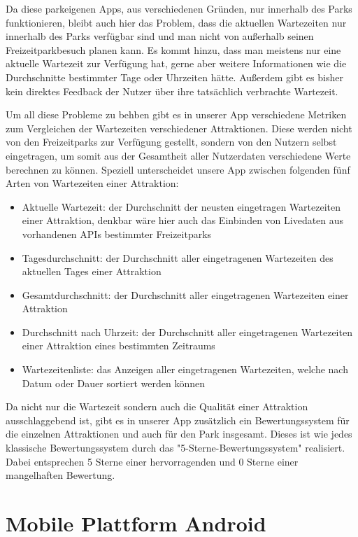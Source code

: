 Da diese parkeigenen Apps, aus verschiedenen Gründen, nur innerhalb des Parks funktionieren, bleibt auch hier das Problem, dass die aktuellen Wartezeiten nur innerhalb des Parks verfügbar sind und man nicht von außerhalb seinen Freizeitparkbesuch planen kann. Es kommt hinzu, dass man meistens nur eine aktuelle Wartezeit zur Verfügung hat, gerne aber weitere Informationen wie die Durchschnitte bestimmter Tage oder Uhrzeiten hätte. Außerdem gibt es bisher kein direktes Feedback der Nutzer über ihre tatsächlich verbrachte Wartezeit. 

Um all diese Probleme zu behben gibt es in unserer App verschiedene Metriken zum Vergleichen der Wartezeiten verschiedener Attraktionen. Diese werden nicht von den Freizeitparks zur Verfügung gestellt, sondern von den Nutzern selbst eingetragen, um somit aus der Gesamtheit aller Nutzerdaten verschiedene Werte berechnen zu können. Speziell unterscheidet unsere App zwischen folgenden fünf Arten von Wartezeiten einer Attraktion:
\begin{itemize}
\item Aktuelle Wartezeit: der Durchschnitt der neusten eingetragen Wartezeiten einer Attraktion, denkbar wäre hier auch das Einbinden von Livedaten aus vorhandenen APIs bestimmter Freizeitparks
\item Tagesdurchschnitt: der Durchschnitt aller eingetragenen Wartezeiten des aktuellen Tages einer Attraktion
\item Gesamtdurchschnitt: der Durchschnitt aller eingetragenen Wartezeiten einer Attraktion
\item Durchschnitt nach Uhrzeit: der Durchschnitt aller eingetragenen Wartezeiten einer Attraktion eines bestimmten Zeitraums
\item Wartezeitenliste: das Anzeigen aller eingetragenen Wartezeiten, welche nach Datum oder Dauer sortiert werden können
\end{itemize}

Da nicht nur die Wartezeit sondern auch die Qualität einer Attraktion ausschlaggebend ist, gibt es in unserer App zusätzlich ein Bewertungssystem für die einzelnen Attraktionen und auch für den Park insgesamt. Dieses ist wie jedes klassische Bewertungssystem durch das "5-Sterne-Bewertungssystem"{} realisiert. Dabei entsprechen 5 Sterne einer hervorragenden und 0 Sterne einer mangelhaften Bewertung.

\section{Mobile Plattform Android}
\label{sec:grundlagen:plattforml}

